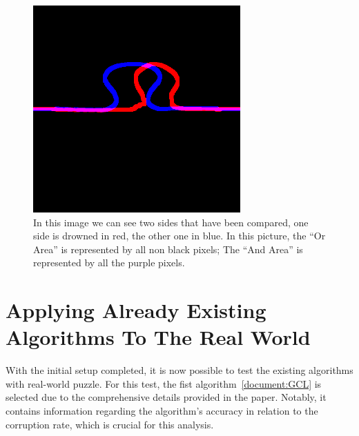\documentclass{article}
\begin{document}
\begin{figure}[htbp]
  \centering
  \begin{minipage}[t]{0.44\textwidth}
    \vspace{3pt} %
    \includegraphics[width=\textwidth]{pictures/side_comparation.png}
  \end{minipage}
  \hfill
  \begin{minipage}[t]{0.54\textwidth}
    \caption{\newline
    In this image we can see two sides that have been
    compared, one side is drowned in red, the other one in blue.
    In this picture, the “Or Area” is represented by all non
    black pixels; The “And Area” is represented by all the
    purple pixels.}
  \end{minipage}
\end{figure}
\clearpage

\section{Applying Already Existing Algorithms To The Real World}
With the initial setup completed, it is now possible to
test the existing algorithms with real-world puzzle. For this test,
the fist algorithm~\ref{document:GCL} is selected due to the comprehensive
details provided in the paper. Notably, it contains information
regarding the algorithm's accuracy in relation to the corruption rate,
which is crucial for this analysis.
\end{document}

